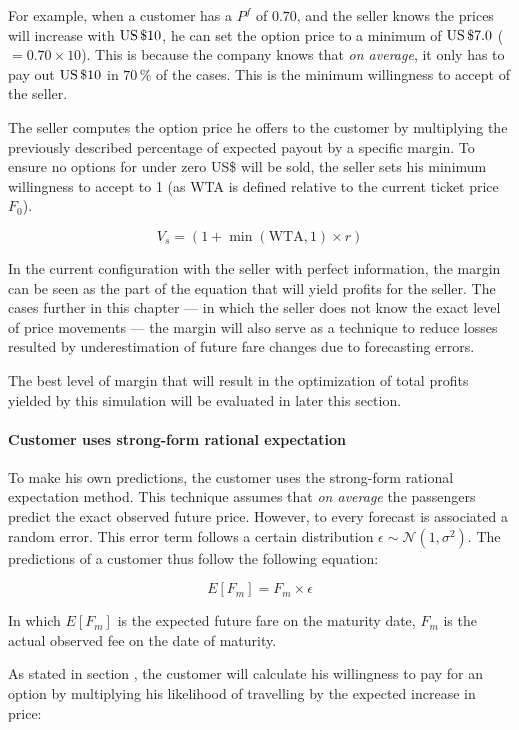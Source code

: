 For example, when a customer has a $P^f$ of $0.70$, and the seller knows the prices will increase with $\mbox{US\,\$} 10$, he can set the option price to a minimum of $\mbox{US\,\$} 7.0$ ($= 0.70 \times 10$). This is because the company knows that \emph{on average}, it only has to pay out $\mbox{US\,\$} 10$ in $70\,\%$ of the cases. This is the minimum willingness to accept of the seller.

The seller computes the option price he offers to the customer by multiplying the previously described percentage of expected payout by a specific margin. To ensure no options for under zero US\$ will be sold, the seller sets his minimum willingness to accept to 1 (as WTA is defined relative to the current ticket price $F_0$).

$$ V_s = (1 + \min(\mbox{WTA}, 1) \times r) $$

In the current configuration with the seller with perfect information, the margin can be seen as the part of the equation that will yield profits for the seller. The cases further in this chapter --- in which the seller does not know the exact level of price movements --- the margin will also serve as a technique to reduce losses resulted by underestimation of future fare changes due to forecasting errors.

The best level of margin that will result in the optimization of total profits yielded by this simulation will be evaluated in later this section.


\paragraph{Customer uses strong-form rational expectation}
To make his own predictions, the customer uses the strong-form rational expectation method. This technique assumes that \emph{on average} the passengers predict the exact observed future price. However, to every forecast is associated a random error. This error term follows a certain distribution $\epsilon \sim \mathcal{N}(1, \sigma^2)$. The predictions of a customer thus follow the following equation:

$$ E[F_m] = F_m \times \epsilon $$

In which $E[F_m]$ is the expected future fare on the maturity date, $F_m$ is the actual observed fee on the date of maturity.

As stated in section , the customer will calculate his willingness to pay for an option by multiplying his likelihood of travelling by the expected increase in price:

